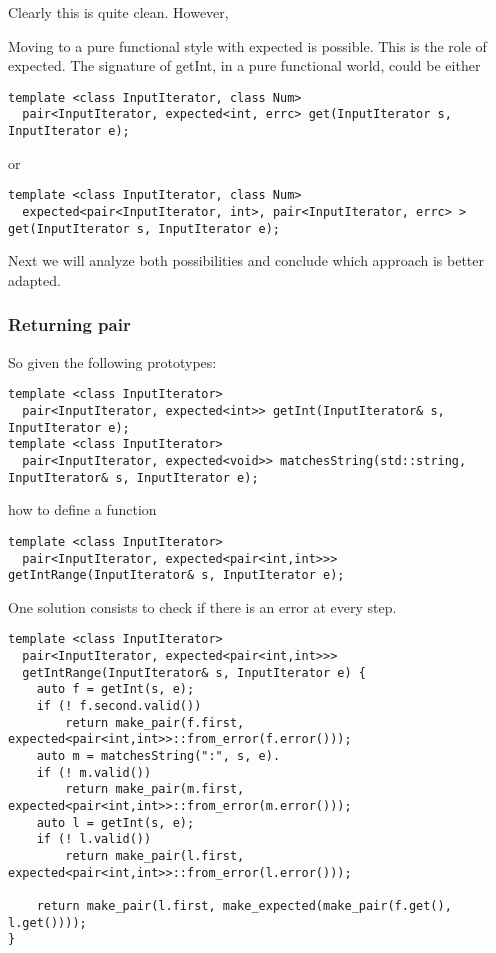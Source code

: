 \documentclass[a4paper,10pt]{article}
\begin{document}
Clearly this is quite clean. However, 

Moving to a pure functional style with expected is possible.
This is the role of expected. The signature of getInt, in a pure functional world,  could be either

\begin{lstlisting}
template <class InputIterator, class Num>
  pair<InputIterator, expected<int, errc> get(InputIterator s, InputIterator e);
\end{lstlisting}

or 

\begin{lstlisting}
template <class InputIterator, class Num>
  expected<pair<InputIterator, int>, pair<InputIterator, errc> > get(InputIterator s, InputIterator e);
\end{lstlisting}




Next we will analyze both possibilities and conclude which approach is better adapted.

\subsubsection{Returning pair}

So given the following prototypes:

\begin{lstlisting}
template <class InputIterator>
  pair<InputIterator, expected<int>> getInt(InputIterator& s, InputIterator e);
template <class InputIterator>
  pair<InputIterator, expected<void>> matchesString(std::string, InputIterator& s, InputIterator e);
\end{lstlisting}

how to define a function

\begin{lstlisting}
template <class InputIterator>
  pair<InputIterator, expected<pair<int,int>>> getIntRange(InputIterator& s, InputIterator e);
\end{lstlisting}


One solution consists to check if there is an error at every step. 

\begin{lstlisting}
template <class InputIterator>
  pair<InputIterator, expected<pair<int,int>>> 
  getIntRange(InputIterator& s, InputIterator e) {
    auto f = getInt(s, e);
    if (! f.second.valid())  
        return make_pair(f.first, expected<pair<int,int>>::from_error(f.error()));
    auto m = matchesString(":", s, e).
    if (! m.valid())  
        return make_pair(m.first, expected<pair<int,int>>::from_error(m.error()));
    auto l = getInt(s, e);
    if (! l.valid())   
        return make_pair(l.first, expected<pair<int,int>>::from_error(l.error()));
        
    return make_pair(l.first, make_expected(make_pair(f.get(), l.get())));
}
\end{lstlisting}
\end{document}
